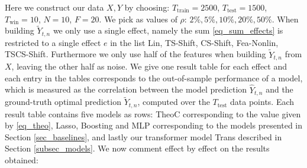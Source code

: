 \documentclass{article}
\begin{document}
Here we construct our data $X, Y$ by choosing: $T_{\text{train}} = 2500$, $T_{\text{test}} = 1500$, $T_{\text{win}} = 10$, $N = 10$, $F = 20$. We pick as values of $\rho$: $2\%, 5\%, 10\%, 20\%, 50\%$. When building $\widetilde Y_{t,n}$ we only use a single effect, namely the sum \eqref{eq_sum_effects} is restricted to a single effect $e$ in the list Lin, TS-Shift, CS-Shift, Fea-Nonlin, TSCS-Shift. Furthermore we only use half of the features when building $\widetilde Y_{t,n}$ from $X$, leaving the other half as noise. We give one result table for each effect and each entry in the tables corresponds to the out-of-sample performance of a model, which is measured as the correlation between the model prediction $\widehat Y_{t,n}$ and the ground-truth optimal prediction $\widetilde Y_{t,n}$, computed over the $T_{\text{test}}$ data points. Each result table contains five models as rows: TheoC corresponding to the value given by \eqref{eq_theo}, Lasso, Boosting and MLP corresponding to the models presented in Section \ref{sec_baselines}, and lastly our transformer model Trans described in Section \ref{subsec_models}. We now comment effect by effect on the results obtained:
\end{document}
